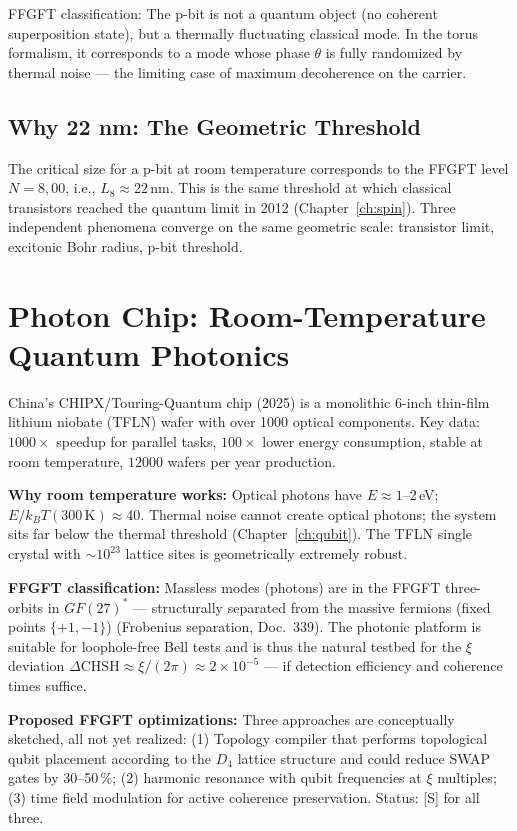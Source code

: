 FFGFT classification: The p-bit is not a quantum object (no coherent
superposition state), but a thermally fluctuating classical
mode. In the torus formalism, it corresponds to a mode whose phase $\theta$
is fully randomized by thermal noise --- the limiting case of
maximum decoherence on the carrier.

\subsection*{Why 22 nm: The Geometric Threshold}

The critical size for a p-bit at room temperature corresponds to the
FFGFT level $N = 8{,}00$, i.e., $L_8\approx22$\,nm. This is the same
threshold at which classical transistors reached the quantum limit in 2012 (Chapter~\ref{ch:spin}). Three independent phenomena converge
on the same geometric scale: transistor limit, excitonic
Bohr radius, p-bit threshold.

\section{Photon Chip: Room-Temperature Quantum Photonics}

China's CHIPX/Touring-Quantum chip (2025) is a monolithic
6-inch thin-film lithium niobate (TFLN) wafer with over 1000 optical
components. Key data: $1000\times$ speedup for parallel tasks,
$100\times$ lower energy consumption, stable at room temperature,
$12000$ wafers per year production.

\textbf{Why room temperature works:} Optical photons have
$E\approx1$--2\,eV; $E/k_BT(300\,\text{K})\approx40$. Thermal
noise cannot create optical photons; the system sits far
below the thermal threshold (Chapter~\ref{ch:qubit}). The TFLN
single crystal with $\sim10^{23}$ lattice sites is geometrically extremely
robust.

\textbf{FFGFT classification:} Massless modes (photons) are in the FFGFT
three-orbits in $GF(27)^*$ --- structurally separated from the massive fermions
(fixed points $\{+1,-1\}$) (Frobenius separation, Doc.~339).
The photonic platform is suitable for loophole-free Bell tests and
is thus the natural testbed for the $\xi$ deviation
$\Delta\mathrm{CHSH}\approx\xi/(2\pi)\approx2\times10^{-5}$ --- if
detection efficiency and coherence times suffice.

\textbf{Proposed FFGFT optimizations:} Three approaches are conceptually
sketched, all not yet realized: (1) Topology compiler that performs
topological qubit placement according to the $D_4$ lattice structure
and could reduce SWAP gates by 30--50\,\%; (2) harmonic resonance
with qubit frequencies at $\xi$ multiples; (3) time field modulation for
active coherence preservation. Status: [S] for all three.

